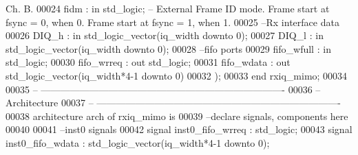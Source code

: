\begin{DoxyCode}
{       Ch. B. }
00024       \textcolor{vhdlchar}{fidm}         \textcolor{vhdlchar}{:} \textcolor{keywordflow}{in} \textcolor{comment}{std\_logic};\textcolor{keyword}{ -- External Frame ID mode. Frame start at fsync = 0, when 0. Frame start
       at fsync = 1, when 1.}
00025 \textcolor{keyword}{      --Rx interface data }
00026       \textcolor{vhdlchar}{DIQ_h}         \textcolor{vhdlchar}{:} \textcolor{keywordflow}{in} \textcolor{comment}{std\_logic\_vector}\textcolor{vhdlchar}{(}\textcolor{vhdlchar}{iq_width} \textcolor{keywordflow}{downto} \textcolor{vhdllogic}{}\textcolor{vhdllogic}{0}\textcolor{vhdlchar}{)};
00027         \textcolor{vhdlchar}{DIQ_l}          \textcolor{vhdlchar}{:} \textcolor{keywordflow}{in} \textcolor{comment}{std\_logic\_vector}\textcolor{vhdlchar}{(}\textcolor{vhdlchar}{iq_width} \textcolor{keywordflow}{downto} \textcolor{vhdllogic}{}\textcolor{vhdllogic}{0}\textcolor{vhdlchar}{)};
00028 \textcolor{keyword}{      --fifo ports }
00029       \textcolor{vhdlchar}{fifo_wfull}  \textcolor{vhdlchar}{:} \textcolor{keywordflow}{in} \textcolor{comment}{std\_logic};
00030       \textcolor{vhdlchar}{fifo_wrreq}  \textcolor{vhdlchar}{:} \textcolor{keywordflow}{out} \textcolor{comment}{std\_logic};
00031       \textcolor{vhdlchar}{fifo_wdata}  \textcolor{vhdlchar}{:} \textcolor{keywordflow}{out} \textcolor{comment}{std\_logic\_vector}\textcolor{vhdlchar}{(}\textcolor{vhdlchar}{iq_width}\textcolor{vhdlchar}{*}\textcolor{vhdllogic}{4-1} \textcolor{keywordflow}{downto} \textcolor{vhdllogic}{}\textcolor{vhdllogic}{0}\textcolor{vhdlchar}{)}   
00032         \textcolor{vhdlchar}{)};
00033 \textcolor{keywordflow}{end} \textcolor{vhdlchar}{rxiq\_mimo};
00034 
00035 \textcolor{keyword}{-- ----------------------------------------------------------------------------}
00036 \textcolor{keyword}{-- Architecture}
00037 \textcolor{keyword}{-- ----------------------------------------------------------------------------}
00038 \textcolor{keywordflow}{architecture} arch \textcolor{keywordflow}{of} rxiq_mimo is
00039 \textcolor{keyword}{--declare signals,  components here}
00040 
00041 \textcolor{keyword}{--inst0 signals}
00042 \textcolor{keywordflow}{signal} \textcolor{vhdlchar}{inst0_fifo_wrreq} \textcolor{vhdlchar}{:} \textcolor{comment}{std\_logic};
00043 \textcolor{keywordflow}{signal} \textcolor{vhdlchar}{inst0_fifo_wdata} \textcolor{vhdlchar}{:} \textcolor{comment}{std\_logic\_vector}\textcolor{vhdlchar}{(}\textcolor{vhdlchar}{iq_width}\textcolor{vhdlchar}{*}\textcolor{vhdllogic}{4-1} \textcolor{keywordflow}{downto} \textcolor{vhdllogic}{}\textcolor{vhdllogic}{0}\textcolor{vhdlchar}{)};

\end{DoxyCode}
